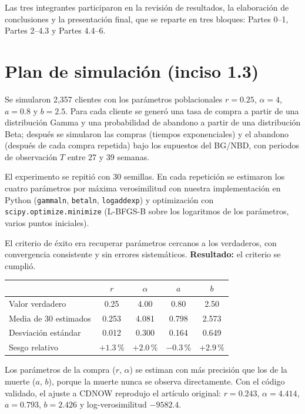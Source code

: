 \documentclass[11pt,a4paper]{article}
\begin{document}
Las tres integrantes participaron en la revisión de resultados, la elaboración de conclusiones y la presentación final, que se reparte en tres bloques: Partes 0–1, Partes 2–4.3 y Partes 4.4–6.

\section*{Plan de simulación (inciso 1.3)}
Se simularon 2,357 clientes con los parámetros poblacionales $r=0.25$, $\alpha=4$, $a=0.8$ y $b=2.5$. Para cada cliente se generó una tasa de compra a partir de una distribución Gamma y una probabilidad de abandono a partir de una distribución Beta; después se simularon las compras (tiempos exponenciales) y el abandono (después de cada compra repetida) bajo los supuestos del BG/NBD, con periodos de observación $T$ entre 27 y 39 semanas.

El experimento se repitió con 30 semillas. En cada repetición se estimaron los cuatro parámetros por máxima verosimilitud con nuestra implementación en Python (\texttt{gammaln}, \texttt{betaln}, \texttt{logaddexp}) y optimización con \texttt{scipy.optimize.minimize} (L-BFGS-B sobre los logaritmos de los parámetros, varios puntos iniciales).

El criterio de éxito era recuperar parámetros cercanos a los verdaderos, con convergencia consistente y sin errores sistemáticos. \textbf{Resultado:} el criterio se cumplió.

\begin{center}
\begin{tabular}{lcccc}
\toprule
& $r$ & $\alpha$ & $a$ & $b$ \\
\midrule
Valor verdadero & 0.25 & 4.00 & 0.80 & 2.50 \\
Media de 30 estimados & 0.253 & 4.081 & 0.798 & 2.573 \\
Desviación estándar & 0.012 & 0.300 & 0.164 & 0.649 \\
Sesgo relativo & $+1.3\,\%$ & $+2.0\,\%$ & $-0.3\,\%$ & $+2.9\,\%$ \\
\bottomrule
\end{tabular}
\end{center}

Los parámetros de la compra ($r$, $\alpha$) se estiman con más precisión que los de la muerte ($a$, $b$), porque la muerte nunca se observa directamente. Con el código validado, el ajuste a CDNOW reprodujo el artículo original: $r=0.243$, $\alpha=4.414$, $a=0.793$, $b=2.426$ y log-verosimilitud $-9582.4$.
\end{document}
